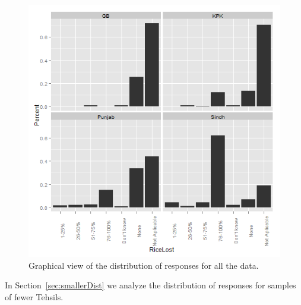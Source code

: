 \begin{figure}[!hbt]
\begin{knitrout}
{\centering \includegraphics[width=.9\linewidth]{overall/figures/overallDistPlot} 

}


\end{knitrout}

\caption{Graphical view of the distribution of responses for all the data.\label{fig:fullDist}}
\end{figure}

In Section~\ref{sec:smallerDist} we analyze the distribution of responses for samples of fewer Tehsils.
